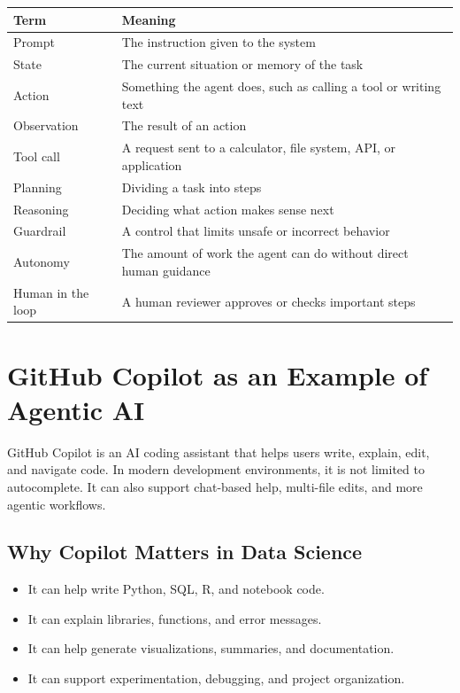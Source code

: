 \documentclass[11pt,a4paper]{article}
\begin{document}
\begin{longtable}{@{}p{3.4cm}p{10cm}@{}}
\toprule
\rowcolor{primary!15}
\textbf{Term} & \textbf{Meaning} \\
\midrule
\endhead
Prompt & The instruction given to the system \\
\addlinespace
State & The current situation or memory of the task \\
\addlinespace
Action & Something the agent does, such as calling a tool or writing text \\
\addlinespace
Observation & The result of an action \\
\addlinespace
Tool call & A request sent to a calculator, file system, API, or application \\
\addlinespace
Planning & Dividing a task into steps \\
\addlinespace
Reasoning & Deciding what action makes sense next \\
\addlinespace
Guardrail & A control that limits unsafe or incorrect behavior \\
\addlinespace
Autonomy & The amount of work the agent can do without direct human guidance \\
\addlinespace
Human in the loop & A human reviewer approves or checks important steps \\
\bottomrule
\end{longtable}

\section{GitHub Copilot as an Example of Agentic AI}

\begin{definitionbox}
GitHub Copilot is an AI coding assistant that helps users write, explain, edit, and navigate code. In modern development environments, it is not limited to autocomplete. It can also support chat-based help, multi-file edits, and more agentic workflows.
\end{definitionbox}

\subsection{Why Copilot Matters in Data Science}

\begin{itemize}[leftmargin=*]
  \item It can help write Python, SQL, R, and notebook code.
  \item It can explain libraries, functions, and error messages.
  \item It can help generate visualizations, summaries, and documentation.
  \item It can support experimentation, debugging, and project organization.
\end{itemize}
\end{document}
